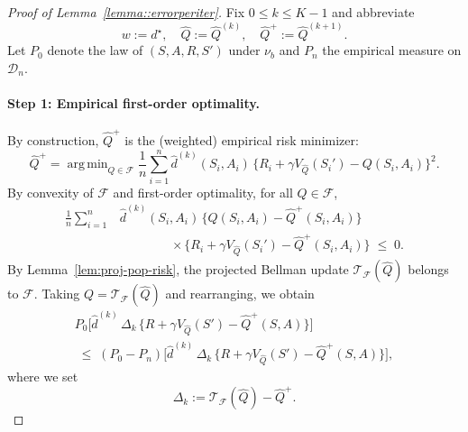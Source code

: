 \documentclass{article}
\DeclareMathOperator*{\argmin}{arg\,min}
\theoremstyle{plain}
\theoremstyle{definition}
\theoremstyle{remark}
\begin{document}
\begin{proof}[Proof of Lemma~\ref{lemma::errorperiter}]
Fix $0 \le k \le K-1$ and abbreviate
\[
w := d^\star,
\quad
\widehat Q := \widehat Q^{(k)},
\quad
\widehat Q^+ := \widehat Q^{(k+1)}.
\]
Let $P_0$ denote the law of $(S,A,R,S')$ under $\nu_b$ and $P_n$ the empirical
measure on $\mathcal D_n$.

\paragraph{Step 1: Empirical first-order optimality.}
By construction, $\widehat Q^+$ is the (weighted) empirical risk minimizer:
\[
\widehat Q^+
=
\argmin_{Q\in\mathcal F}
\frac{1}{n}\sum_{i=1}^n
\widehat d^{(k)}(S_i,A_i)\,
\bigl\{
  R_i + \gamma V_{\widehat Q}(S_i')
  - Q(S_i,A_i)
\bigr\}^2.
\]
By convexity of $\mathcal F$ and first-order optimality, for all $Q\in\mathcal F$,
\begin{align*}
\frac{1}{n}\sum_{i=1}^n
&\widehat d^{(k)}(S_i,A_i)\,
\bigl\{Q(S_i,A_i)-\widehat Q^+(S_i,A_i)\bigr\}
\\[-0.25em]
&\qquad\qquad\times
\bigl\{
  R_i + \gamma V_{\widehat Q}(S_i')
  - \widehat Q^+(S_i,A_i)
\bigr\}
\;\le\; 0.
\end{align*}
By Lemma~\ref{lem:proj-pop-risk}, the projected Bellman update
$\mathcal T_{\mathcal F}(\widehat Q)$ belongs to $\mathcal F$. Taking
$Q = \mathcal T_{\mathcal F}(\widehat Q)$ and rearranging, we obtain
\begin{equation}
\label{eq:firstbasic-fqi}
\begin{aligned}
P_0\big[
   \widehat d^{(k)}\,
   \Delta_k\,
   \{R + \gamma V_{\widehat Q}(S') - \widehat Q^+(S,A)\}
\big]
\\[-0.25em]
\;\le\;
(P_0 - P_n)\big[
   \widehat d^{(k)}\,
   \Delta_k\,
   \{R + \gamma V_{\widehat Q}(S') - \widehat Q^+(S,A)\}
\big],
\end{aligned}
\end{equation}
where we set
\[
\Delta_k
:=
\mathcal T_{\mathcal F}(\widehat Q) - \widehat Q^+.
\]


\end{proof}
\end{document}
